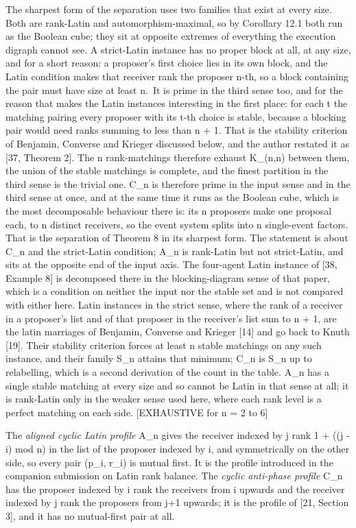 \documentclass[
  11pt,
]{article}
\begin{document}
The sharpest form of the separation uses two families that exist at
every size. Both are rank-Latin and automorphism-maximal, so by
Corollary 12.1 both run as the Boolean cube; they sit at opposite
extremes of everything the execution digraph cannot see. A strict-Latin
instance has no proper block at all, at any size, and for a short
reason: a proposer's first choice lies in its own block, and the Latin
condition makes that receiver rank the proposer n-th, so a block
containing the pair must have size at least n.~It is prime in the third
sense too, and for the reason that makes the Latin instances interesting
in the first place: for each t the matching pairing every proposer with
its t-th choice is stable, because a blocking pair would need ranks
summing to less than n + 1. That is the stability criterion of Benjamin,
Converse and Krieger discussed below, and the author restated it as
{[}37, Theorem 2{]}. The n rank-matchings therefore exhaust K\_(n,n)
between them, the union of the stable matchings is complete, and the
finest partition in the third sense is the trivial one. C\_n is
therefore prime in the input sense and in the third sense at once, and
at the same time it runs as the Boolean cube, which is the most
decomposable behaviour there is: its n proposers make one proposal each,
to n distinct receivers, so the event system splits into n single-event
factors. That is the separation of Theorem 8 in its sharpest form. The
statement is about C\_n and the strict-Latin condition; A\_n is
rank-Latin but not strict-Latin, and sits at the opposite end of the
input axis. The four-agent Latin instance of {[}38, Example 8{]} is
decomposed there in the blocking-diagram sense of that paper, which is a
condition on neither the input nor the stable set and is not compared
with either here. Latin instances in the strict sense, where the rank of
a receiver in a proposer's list and of that proposer in the receiver's
list sum to n + 1, are the latin marriages of Benjamin, Converse and
Krieger {[}14{]} and go back to Knuth {[}19{]}. Their stability
criterion forces at least n stable matchings on any such instance, and
their family S\_n attains that minimum; C\_n is S\_n up to relabelling,
which is a second derivation of the count in the table. A\_n has a
single stable matching at every size and so cannot be Latin in that
sense at all; it is rank-Latin only in the weaker sense used here, where
each rank level is a perfect matching on each side. {[}EXHAUSTIVE for n
= 2 to 6{]}

The \emph{aligned cyclic Latin profile} A\_n gives the receiver indexed
by j rank 1 + ((j - i) mod n) in the list of the proposer indexed by i,
and symmetrically on the other side, so every pair (p\_i, r\_i) is
mutual first. It is the profile introduced in the companion submission
on Latin rank balance. The \emph{cyclic anti-phase profile} C\_n has the
proposer indexed by i rank the receivers from i upwards and the receiver
indexed by j rank the proposers from j+1 upwards; it is the profile of
{[}21, Section 3{]}, and it has no mutual-first pair at all.
\end{document}
